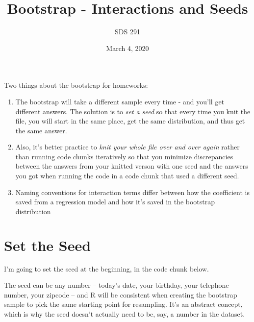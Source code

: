 \documentclass[]{article}
\title{Bootstrap - Interactions and Seeds}
\author{SDS 291}
\date{March 4, 2020}
\newenvironment{Shaded}{\begin{snugshade}}{\end{snugshade}}
\newcommand{\DataTypeTok}[1]{\textcolor[rgb]{0.13,0.29,0.53}{#1}}
\newcommand{\DecValTok}[1]{\textcolor[rgb]{0.00,0.00,0.81}{#1}}
\newcommand{\KeywordTok}[1]{\textcolor[rgb]{0.13,0.29,0.53}{\textbf{#1}}}
\newcommand{\NormalTok}[1]{#1}
\newcommand{\OperatorTok}[1]{\textcolor[rgb]{0.81,0.36,0.00}{\textbf{#1}}}
\newcommand{\OtherTok}[1]{\textcolor[rgb]{0.56,0.35,0.01}{#1}}
\newcommand{\StringTok}[1]{\textcolor[rgb]{0.31,0.60,0.02}{#1}}
\begin{document}
\maketitle

Two things about the bootstrap for homeworks:

\begin{enumerate}
\def\labelenumi{\arabic{enumi}.}
\item
  The bootstrap will take a different sample every time - and you'll get
  different answers. The solution is to \emph{set a seed} so that every
  time you knit the file, you will start in the same place, get the same
  distribution, and thus get the same answer.
\item
  Also, it's better practice to \emph{knit your whole file over and over
  again} rather than running code chunks iteratively so that you
  minimize discrepancies between the answers from your knitted verson
  with one seed and the answers you got when running the code in a code
  chunk that used a different seed.
\item
  Naming conventions for interaction terms differ between how the
  coefficient is saved from a regression model and how it's saved in the
  bootstrap distribution
\end{enumerate}

\hypertarget{set-the-seed}{%
\section{Set the Seed}\label{set-the-seed}}

I'm going to set the seed at the beginning, in the code chunk below.

\begin{Shaded}
\end{Shaded}

The seed can be any number -- today's date, your birthday, your
telephone number, your zipcode -- and R will be consistent when creating
the bootstrap sample to pick the same starting point for resampling.
It's an abstract concept, which is why the seed doesn't actually need to
be, say, a number in the dataset.
\end{document}
